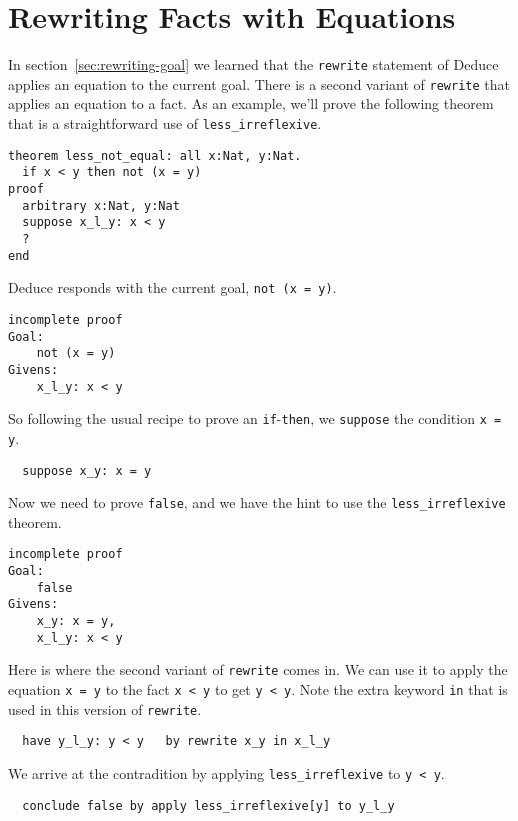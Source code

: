 \documentclass[12pt]{article}
\begin{document}
\section{Rewriting Facts with Equations}
\label{sec:rewriting-facts}  

In section~\ref{sec:rewriting-goal} we learned that the
\texttt{rewrite} statement of Deduce applies an equation to the
current goal.  There is a second variant of \texttt{rewrite} that
applies an equation to a fact. As an example, we'll prove the
following theorem that is a straightforward use of
\texttt{less\_irreflexive}.

\begin{verbatim}
theorem less_not_equal: all x:Nat, y:Nat.
  if x < y then not (x = y)
proof
  arbitrary x:Nat, y:Nat
  suppose x_l_y: x < y
  ?
end
\end{verbatim}

Deduce responds with the current goal, \texttt{not (x = y)}.

\begin{verbatim}
incomplete proof
Goal:
    not (x = y)
Givens:
    x_l_y: x < y
\end{verbatim}

So following the usual recipe to prove an \texttt{if}-\texttt{then},
we \texttt{suppose} the condition \texttt{x = y}.

\begin{verbatim}
  suppose x_y: x = y
\end{verbatim}

Now we need to prove \texttt{false}, and we have the hint to use the
\texttt{less\_irreflexive} theorem.

\begin{verbatim}
incomplete proof
Goal:
    false
Givens:
    x_y: x = y,
    x_l_y: x < y
\end{verbatim}

Here is where the second variant of \texttt{rewrite} comes in.  We can
use it to apply the equation \texttt{x = y} to the fact \texttt{x < y}
to get \texttt{y < y}.  Note the extra keyword \texttt{in} that is
used in this version of \texttt{rewrite}.

\begin{verbatim}
  have y_l_y: y < y   by rewrite x_y in x_l_y
\end{verbatim}

We arrive at the contradition by applying \texttt{less\_irreflexive}
to \texttt{y < y}.

\begin{verbatim}
  conclude false by apply less_irreflexive[y] to y_l_y
\end{verbatim}
\end{document}
